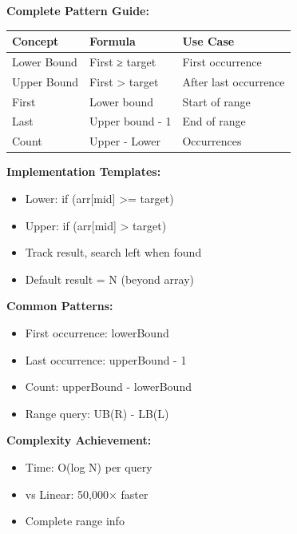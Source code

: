 \documentclass[11pt,a4paper,oneside]{book}
\begin{document}
\begin{tcolorbox}[
    enhanced,breakable,
    colback=primaryblue!10,
    colframe=primaryblue,
    boxrule=2pt,
    arc=4mm,
    title=\textbf{Lower/Upper Bound: Complete Mastery}
]
\textbf{Complete Pattern Guide:}

\begin{center}
\begin{tabular}{|l|l|l|}
\hline
\rowcolor{lightgray}
\textbf{Concept} & \textbf{Formula} & \textbf{Use Case} \\
\hline
Lower Bound & First ≥ target & First occurrence \\
\hline
Upper Bound & First > target & After last occurrence \\
\hline
First & Lower bound & Start of range \\
\hline
Last & Upper bound - 1 & End of range \\
\hline
Count & Upper - Lower & Occurrences \\
\hline
\end{tabular}
\end{center}

\textbf{Implementation Templates:}
\begin{itemize}
    \item  Lower: if (arr[mid] >= target)
    \item  Upper: if (arr[mid] > target)
    \item  Track result, search left when found
    \item  Default result = N (beyond array)
\end{itemize}

\textbf{Common Patterns:}
\begin{itemize}
    \item First occurrence: lowerBound
    \item Last occurrence: upperBound - 1
    \item Count: upperBound - lowerBound
    \item Range query: UB(R) - LB(L)
\end{itemize}

\textbf{Complexity Achievement:}
\begin{itemize}
    \item Time: O(log N) per query
    \item vs Linear: 50,000× faster
    \item Complete range info
\end{itemize}
\end{tcolorbox}
\end{document}
